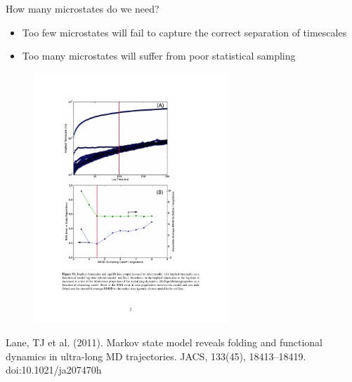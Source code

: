 \documentclass{beamer}
\begin{document}
\begin{frame}{How many microstates do we need?}
\begin{itemize}
    \item Too few microstates will fail to capture the correct separation of timescales
    \item Too many microstates will suffer from poor statistical sampling 
\end{itemize}
\begin{figure}
\includegraphics[width=0.65\textwidth]{ww-clustering}
\end{figure}

\tiny
Lane, TJ et al. (2011).  Markov state model reveals folding and functional dynamics in ultra-long MD trajectories. JACS, 133(45), 18413–18419. doi:10.1021/ja207470h
\normalsize

\end{frame}
\end{document}
